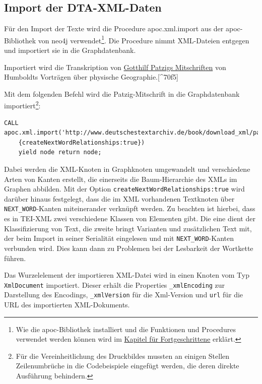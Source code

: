 \documentclass[12pt,ngerman,]{article}
\begin{document}
\subsection{Import der DTA-XML-Daten}\label{import-der-dta-xml-daten}

Für den Import der Texte wird die Procedure apoc.xml.import aus der
apoc-Bibliothek von neo4j verwendet\footnote{Wie die apoc-Bibliothek
  installiert und die Funktionen und Procedures verwendet werden können
  wird im \href{85-cypher-fuer-Fortgeschrittene.md}{Kapitel für
  Fortgeschrittene} erklärt.}. Die Procedure nimmt XML-Dateien entgegen
und importiert sie in die Graphdatenbank.

Importiert wird die Transkription von
\href{http://www.deutschestextarchiv.de/patzig_msgermfol841842_1828/13}{Gotthilf
Patzigs Mitschriften} von Humboldts Vorträgen über physische
Geographie.{[}\^{}70f5{]}

Mit dem folgenden Befehl wird die Patzig-Mitschrift in die
Graphdatenbank importiert\footnote{Für die Vereinheitlichung des
  Druckbildes mussten an einigen Stellen Zeilenumbrüche in die
  Codebeispiele eingefügt werden, die deren direkte Ausführung
  behindern.}:

\begin{verbatim}
CALL apoc.xml.import('http://www.deutschestextarchiv.de/book/download_xml/patzig_msgermfol841842_1828',
    {createNextWordRelationships:true})     
    yield node return node;
\end{verbatim}

Dabei werden die XML-Knoten in Graphknoten umgewandelt und verschiedene
Arten von Kanten erstellt, die einerseits die Baum-Hierarchie des XMLs
im Graphen abbilden. Mit der Option
\texttt{createNextWordRelationships:true} wird darüber hinaus
festgelegt, dass die im XML vorhandenen Textknoten über
\texttt{NEXT\_WORD}-Kanten miteinerander verknüpft werden. Zu beachten
ist hierbei, dass es in TEI-XML zwei verschiedene Klassen von Elementen
gibt. Die eine dient der Klassifizierung von Text, die zweite bringt
Varianten und zusätzlichen Text mit, der beim Import in seiner
Serialität eingelesen und mit \texttt{NEXT\_WORD}-Kanten verbunden wird.
Dies kann dann zu Problemen bei der Lesbarkeit der Wortkette führen.

Das Wurzelelement der importieren XML-Datei wird in einen Knoten vom Typ
\texttt{XmlDocument} importiert. Dieser erhält die Properties
\texttt{\_xmlEncoding} zur Darstellung des Encodings,
\texttt{\_xmlVersion} für die Xml-Version und \texttt{url} für die URL
des importierten XML-Dokuments.
\end{document}
